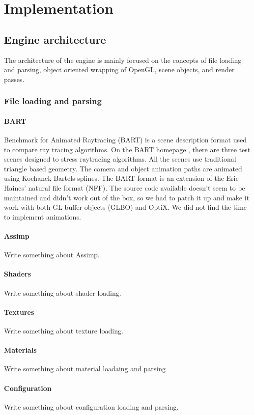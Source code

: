 \section{Implementation}

\subsection{Engine architecture}
The architecture of the engine is mainly focused on the concepts of file loading and parsing, object oriented wrapping of OpenGL, scene objects, and render passes.

\subsubsection{File loading and parsing}
\paragraph{BART}
Benchmark for Animated Raytracing (BART) is a scene description format used to compare ray tracing algorithms. On the BART homepage \cite{bart_homepage}, there are three test scenes designed to stress raytracing algorithms. All the scenes use traditional triangle based geometry. The camera and object animation paths are animated using  Kochanek-Bartels splines. The BART format is an extension of the Eric Haines' natural file format (NFF). The source code available doesn't seem to be maintained and didn't work out of the box, so we had to patch it up and make it work with both GL buffer objects (GLBO) and OptiX. We did not find the time to implement animations.

\paragraph{Assimp}
Write something about Assimp.
\paragraph{Shaders}
Write something about shader loading.
\paragraph{Textures}
Write something about texture loading.
\paragraph{Materials}
Write something about material loadaing and parsing
\paragraph{Configuration}
Write something about configuration loading and parsing.

